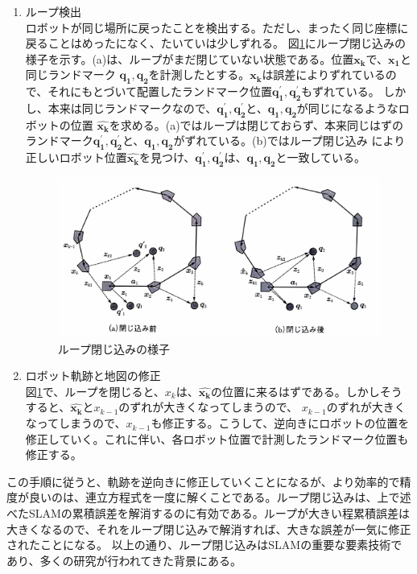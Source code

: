 \begin{enumerate}
  \item ループ検出\\
  ロボットが同じ場所に戻ったことを検出する。ただし、まったく同じ座標に戻ることはめったになく、たいていは少しずれる。
  図\ref{slam:loop_detect}にループ閉じ込みの様子を示す。(a)は、ループがまだ閉じていない状態である。位置$\bm{x_k}$で、$\bm{x_1}$と同じランドマーク
  $\bm{q_1},\bm{q_2}$を計測したとする。$\bm{x_k}$は誤差によりずれているので、それにもとづいて配置したランドマーク位置$\bm{q_1^{\prime}},\bm{q_2^{\prime}}$もずれている。
  しかし、本来は同じランドマークなので、$\bm{q_1^{\prime}},\bm{q_2^{\prime}}$と、$\bm{q_1},\bm{q_2}$が同じになるようなロボットの位置
  $\hat{\bm{x_k}}$を求める。(a)ではループは閉じておらず、本来同じはずのランドマーク$\bm{q_1^{\prime}},\bm{q_2^{\prime}}$と、$\bm{q_1},\bm{q_2}$がずれている。(b)ではループ閉じ込み
  により正しいロボット位置$\hat{\bm{x_k}}$を見つけ、$\bm{q_1^{\prime}},\bm{q_2^{\prime}}$は、$\bm{q_1},\bm{q_2}$と一致している。
  
  \begin{figure}[h]
    \begin{center}
    \includegraphics[width=.8\linewidth]{img/slam_10.pdf}
    \caption{ループ閉じ込みの様子}
    \label{slam:loop_detect}
    \end{center}
  \end{figure}
  \item ロボット軌跡と地図の修正\\
  図\ref{slam:loop_detect}で、ループを閉じると、$x_k$は、$\hat{\bm{x_k}}$の位置に来るはずである。しかしそうすると、$\hat{\bm{x_k}}$と$x_{k-1}$のずれが大きくなってしまうので、
  $x_{k-1}$のずれが大きくなってしまうので、$x_{k-1}$も修正する。こうして、逆向きにロボットの位置を修正していく。これに伴い、各ロボット位置で計測したランドマーク位置も修正する。
\end{enumerate}

この手順に従うと、軌跡を逆向きに修正していくことになるが、より効率的で精度が良いのは、連立方程式を一度に解くことである。ループ閉じ込みは、上で述べたSLAMの累積誤差を解消するのに有効である。ループが大きい程累積誤差は大きくなるので、それをループ閉じ込みで解消すれば、大きな誤差が一気に修正されたことになる。
以上の通り、ループ閉じ込みはSLAMの重要な要素技術であり、多くの研究が行われてきた背景にある。

